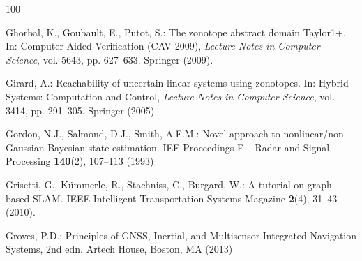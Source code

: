 \documentclass[graybox,envcountchap]{style/SNmono}
\begin{document}
\begin{thebibliography}{100}
{\par}

Ghorbal, K., Goubault, E., Putot, S.: The zonotope abstract domain {Taylor1+}.
\newblock In: Computer Aided Verification (CAV 2009), \emph{Lecture Notes in
  Computer Science}, vol. 5643, pp. 627--633. Springer (2009).
\newblock {}


{\color{red} 
Girard, A.: Reachability of uncertain linear systems using zonotopes.
\newblock In: Hybrid Systems: Computation and Control, \emph{Lecture Notes in
  Computer Science}, vol. 3414, pp. 291--305. Springer (2005)

\par}
{\color{red} 
Gordon, N.J., Salmond, D.J., Smith, A.F.M.: Novel approach to
  nonlinear/non-{G}aussian {B}ayesian state estimation.
\newblock IEE Proceedings F -- Radar and Signal Processing \textbf{140}(2),
  107--113 (1993)

\par}

Grisetti, G., K{\"u}mmerle, R., Stachniss, C., Burgard, W.: A tutorial on
  graph-based {SLAM}.
\newblock IEEE Intelligent Transportation Systems Magazine \textbf{2}(4),
  31--43 (2010).
\newblock {}


{\color{red} 
Groves, P.D.: Principles of {GNSS}, Inertial, and Multisensor Integrated
  Navigation Systems, 2nd edn.
\newblock Artech House, Boston, MA (2013)

\par}
\end{thebibliography}
\end{document}
